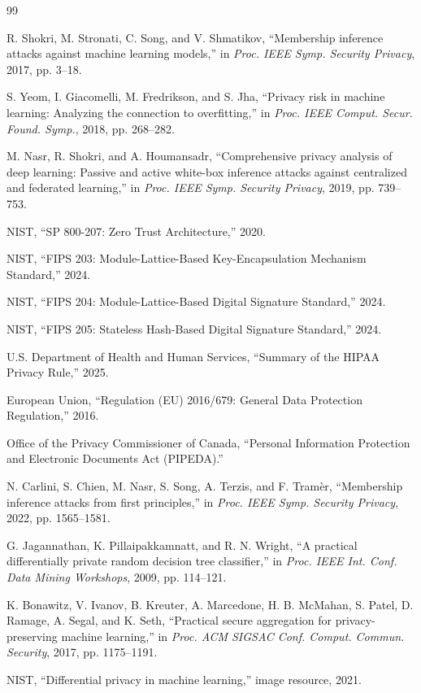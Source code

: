 \documentclass[conference]{IEEEtran}
\begin{document}
	\begin{thebibliography}{99}

		R. Shokri, M. Stronati, C. Song, and V. Shmatikov, ``Membership inference attacks against machine learning models,'' in \textit{Proc. IEEE Symp. Security Privacy}, 2017, pp. 3--18.

		S. Yeom, I. Giacomelli, M. Fredrikson, and S. Jha, ``Privacy risk in machine learning: Analyzing the connection to overfitting,'' in \textit{Proc. IEEE Comput. Secur. Found. Symp.}, 2018, pp. 268--282.

		M. Nasr, R. Shokri, and A. Houmansadr, ``Comprehensive privacy analysis of deep learning: Passive and active white-box inference attacks against centralized and federated learning,'' in \textit{Proc. IEEE Symp. Security Privacy}, 2019, pp. 739--753.

		NIST, ``SP 800-207: Zero Trust Architecture,'' 2020.

		NIST, ``FIPS 203: Module-Lattice-Based Key-Encapsulation Mechanism Standard,'' 2024.

		NIST, ``FIPS 204: Module-Lattice-Based Digital Signature Standard,'' 2024.

		NIST, ``FIPS 205: Stateless Hash-Based Digital Signature Standard,'' 2024.

		U.S. Department of Health and Human Services, ``Summary of the HIPAA Privacy Rule,'' 2025.

		European Union, ``Regulation (EU) 2016/679: General Data Protection Regulation,'' 2016.

		Office of the Privacy Commissioner of Canada, ``Personal Information Protection and Electronic Documents Act (PIPEDA).''

		N. Carlini, S. Chien, M. Nasr, S. Song, A. Terzis, and F. Tram\`{e}r, ``Membership inference attacks from first principles,'' in \textit{Proc. IEEE Symp. Security Privacy}, 2022, pp. 1565--1581.

		G. Jagannathan, K. Pillaipakkamnatt, and R. N. Wright, ``A practical differentially private random decision tree classifier,'' in \textit{Proc. IEEE Int. Conf. Data Mining Workshops}, 2009, pp. 114--121.

		K. Bonawitz, V. Ivanov, B. Kreuter, A. Marcedone, H. B. McMahan, S. Patel, D. Ramage, A. Segal, and K. Seth, ``Practical secure aggregation for privacy-preserving machine learning,'' in \textit{Proc. ACM SIGSAC Conf. Comput. Commun. Security}, 2017, pp. 1175--1191.

		NIST, ``Differential privacy in machine learning,'' image resource, 2021.

	\end{thebibliography}
\end{document}
